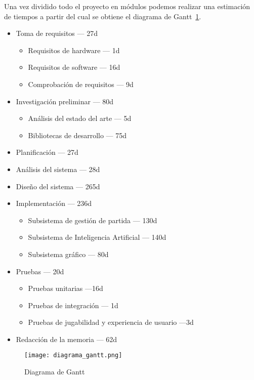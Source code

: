 Una vez dividido todo el proyecto en módulos podemos realizar una estimación de tiempos a partir del cual se
obtiene el diagrama de Gantt~\ref{fig:diag_gantt}.

\begin{itemize}
    \item Toma de requisitos --- 27d
        \begin{itemize}
            \item Requisitos de hardware --- 1d
            \item Requisitos de software --- 16d
            \item Comprobación de requisitos --- 9d
        \end{itemize}
    \item Investigación preliminar --- 80d
        \begin{itemize}
            \item Análisis del estado del arte --- 5d
            \item Bibliotecas de desarrollo --- 75d
        \end{itemize}
    \item Planificación --- 27d
    \item Análisis del sistema --- 28d
    \item Diseño del sistema --- 265d
    \item Implementación --- 236d
        \begin{itemize}
            \item Subsistema de gestión de partida --- 130d
            \item Subsistema de Inteligencia Artificial --- 140d
            \item Subsistema gráfico --- 80d
        \end{itemize}
    \item Pruebas --- 20d
        \begin{itemize}
            \item Pruebas unitarias ---16d
            \item Pruebas de integración --- 1d
            \item Pruebas de jugabilidad y experiencia de usuario ---3d
        \end{itemize}
    \item Redacción de la memoria --- 62d
\end{itemize}

\begin{figure}[h]
  \begin{center}
    \texttt{[image: diagrama\_gantt.png]}
  \end{center}
  \caption{Diagrama de Gantt}
  \label{fig:diag_gantt}
\end{figure}
